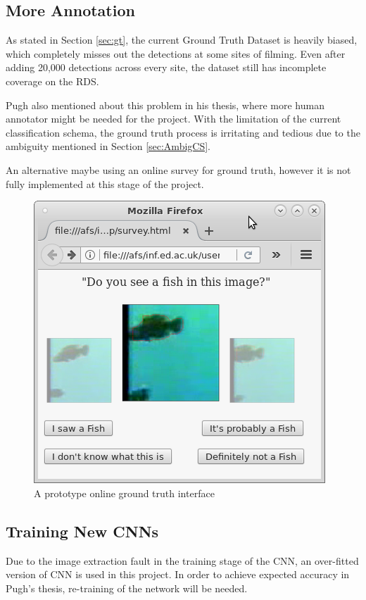 \documentclass[bsc,logo,twoside,fullspacing,parskip]{infthesis}
\begin{document}
\subsection{More Annotation}

As stated in Section \ref{sec:gt}, the current Ground Truth Dataset is heavily biased, which completely misses out the detections at some sites of filming. 
Even after adding 20,000 detections across every site, the dataset still has incomplete coverage on the RDS. 

Pugh also mentioned about this problem in his thesis, where more human annotator might be needed for the project.
With the limitation of the current classification schema, the ground truth process is irritating and tedious due to the ambiguity mentioned in Section \ref{sec:AmbigCS}.

An alternative maybe using an online survey for ground truth, however it is not fully implemented at this stage of the project. 

\begin{figure}[!h]
    \centering
    \includegraphics[scale=0.38]{graph/query.png}
    \caption{A prototype online ground truth interface}
    \label{fig:gto}
\end{figure}

\subsection{Training New CNNs}

Due to the image extraction fault in the training stage of the CNN, an over-fitted version of CNN is used in this project. 
In order to achieve expected accuracy in Pugh's thesis\cite{Pugh}, re-training of the network will be needed.
\end{document}
